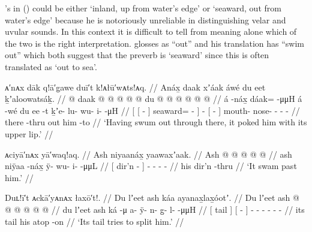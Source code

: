 \citeauthor{swanton:1909}’s  in (\lastx) could be either  ‘inland, up from water’s edge’ or  ‘seaward, out from water’s edge’ because he is notoriously unreliable in distinguishing velar and uvular sounds.
In this context it is difficult to tell from meaning alone which of the two is the right interpretation.
\citeauthor{swanton:1909} glosses  as “out” and his translation has “swim out” which both suggest that the preverb is  ‘seaward’ since this is often translated as ‘out to sea’.

\ex\label{ex:91-235-swam-out-poke-upper-lip}%
%
\begingl
	\glpreamble	ᴀ′nᴀx dāk q!ā′g̣awe duī′t k!ᴀłū′wᴀts!ᴀq. //
	\glpreamble	Anáx̱ daak xʼáak áwé du eet ḵʼaloowatsáḵ. //
	\gla	{} {}  @ {} {}
			daak @  @ {} @ {} @ {} {}
		 @ {}
		{} du  @ {} {}
		 @ {} @ {} @ {} @ {} @ {} //
	\glb	{} {} á -náx̱ {}
			dáak= {}  -μμH {} {}
		á -wé
		{} du ee -t {}
		ḵʼe- lu- wu- i-  -μH //
	\glc	{}[ {}[  - {}]
			seaward= \·  - \· {}]
		 -
		{}[   - {}]
		mouth- nose- - -  - //
	\gld	{} {} there -thru {}
			out  {} {} {} {}
		 {}
		{} him {} -to {}
		 {} {} {} {} {}  //
	\glft	‘Having swum out through there, it poked him with its upper lip.’
		//
\endgl
\xe


\ex\label{ex:91-236-swam-past}%
%
\begingl
	\glpreamble	ᴀciyā′nᴀx yā′waq!aq. //
	\glpreamble	Ash niyaanáx̱ yaawaxʼaak. //
	\gla	{} Ash  @ {} {}
		 @ {} @ {} @ {} @ {} //
	\glb	{} ash niÿaa -náx̱ {}
		ÿ- wu- i-  -μμL //
	\glc	{}[  dir’n - {}]
		- - -  - //
	\gld	{} his dir’n -thru {}
		 {} {} {} {} //
	\glft	‘It swam past him.’
		//
\endgl
\xe

\ex\label{ex:91-237-tail-split-him}%
%
\begingl
	\glpreamble	Duʟ!ī′t ᴀckā′yᴀnᴀx łaxō′t!. //
	\glpreamble	Du lʼeet ash káa ayanax̱lax̱óotʼ. //
	\gla	{} Du lʼeet {} {} ash  @ {} {}
		 @ {} @ {} @ {} @ {} @ {} //
	\glb	{} du lʼeet {} {} ash ká -μ {}
		a- ÿ- n- g̱- l-  -μμH //
	\glc	{}[  tail {}] {}[   - {}]
		- - - - -  - //
	\gld	{} its tail {} {} his atop -on {}
		 {} {} {} {} {} //
	\glft	‘Its tail tries to split him.’
		//
\endgl
\xe


